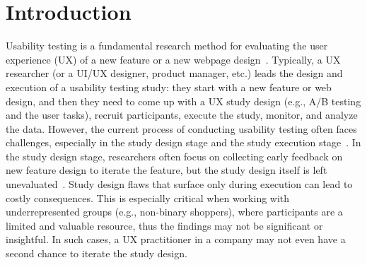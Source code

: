 \documentclass[manuscript,review,anonymous]{acmart}
\DeclareRobustCommand{\note}[1]{{\sethlcolor{orange!30!white}\hl{#1}}}
\begin{document}
\maketitle


\section{Introduction}


Usability testing is a fundamental research method for evaluating the user experience (UX) of a new feature or a new webpage design~\cite{shawHandbookUsabilityTesting1996a}.
Typically, a UX researcher (or a UI/UX designer, product manager, etc.) leads the design and execution of a usability testing study: they start with a new feature or web design, and then they need to come up with a UX study design (e.g., A/B testing and the user tasks), recruit participants, execute the study, monitor, and analyze the data.
However, the current process of conducting usability testing often faces challenges, especially in the study design stage and the study execution stage~\cite{folstadAnalysisPracticalUsability2012, hertzumEvaluatorEffectChilling2003, kuangMergingResultsNo2022, norgaardWhatUsabilityEvaluators2006}.
In the study design stage, researchers often focus on collecting early feedback on new feature design to iterate the feature, but the study design itself is left unevaluated~\cite{shawHandbookUsabilityTesting1996a}.
Study design flaws that surface only during execution can lead to costly consequences. This is especially critical when working with underrepresented groups (e.g., non-binary shoppers), where participants are a limited and valuable resource, thus the findings may not be significant or insightful.
In such cases, a UX practitioner in a company may not even have a second chance to iterate the study design.
\end{document}

